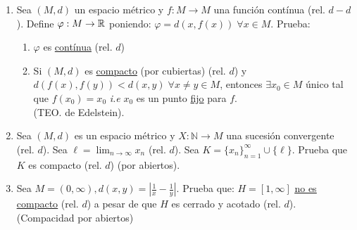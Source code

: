 \documentclass{article}
\newcommand{\N}{\mathbb{N}}
\begin{document}
\begin{enumerate}
    \item Sea $(M,d)$ un espacio métrico y $f:M \to M$ una función contínua (rel. $d-d$). Define $\varphi:M \to \mathbb{R}$ poniendo: $\varphi = d(x, f(x)) \; \forall x \in M$. Prueba: 
    \begin{enumerate}
        \item $\varphi$ es \underline{contínua} (rel. $d$) 
        \item Si $(M,d)$ es \underline{compacto} (por cubiertas) (rel. $d$) y $d(f(x), f(y))< d(x,y) \; \forall x \neq y \in M$, entonces $\exists x_{0} \in M$ único tal que $f(x_{0})=x_{0}$ \textit{i.e} $x_{0}$ es un punto \underline{fijo} para $f$. \\ (TEO. de Edelstein).
    \end{enumerate}
    \item Sea $(M,d)$ es un espacio métrico y $X:\N \to M$ una sucesión convergente (rel. $d$). Sea $\displaystyle\ell = \lim_{n \to \infty} x_{n}$ (rel. $d$). Sea $\displaystyle K=\{x_{n}\}_{n=1}^{\infty}\cup\{\ell\}$. Prueba que $K$ es compacto (rel. $d$) (por abiertos). 
    \item Sea $\displaystyle M=(0,\infty), d(x,y)=\left\lvert \frac{1}{x} - \frac{1}{y} \right\rvert$. Prueba que: $H=[1,\infty]$ \underline{\underline{no es compacto}} (rel. $d$) a pesar de que $H$ es cerrado y acotado (rel. $d$).\\ (Compacidad por abiertos)
\end{enumerate}
    
\end{document}
